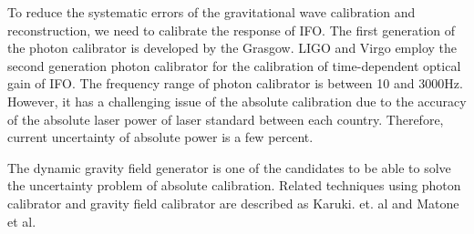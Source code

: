 \documentclass[12pt]{iopart}
\begin{document}
To reduce the systematic errors of the gravitational wave calibration and reconstruction, we need to calibrate the response of IFO. The first generation of the photon calibrator is developed by the Grasgow. LIGO and Virgo employ the second generation photon calibrator for the calibration of time-dependent optical gain of IFO.  The frequency range of photon calibrator is between 10 and 3000Hz.  However, it has a challenging issue of the absolute calibration due to the accuracy of the absolute laser power of laser standard between each country. Therefore, current uncertainty of absolute power is a few percent.

The dynamic gravity field generator is one of the candidates to be able to solve the uncertainty problem of absolute calibration. Related techniques using photon calibrator and gravity field calibrator are described as Karuki. et. al and Matone et al.
\end{document}
